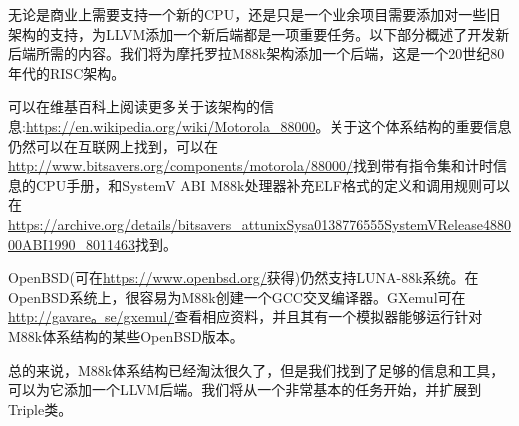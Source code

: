 无论是商业上需要支持一个新的CPU，还是只是一个业余项目需要添加对一些旧架构的支持，为LLVM添加一个新后端都是一项重要任务。以下部分概述了开发新后端所需的内容。我们将为摩托罗拉M88k架构添加一个后端，这是一个20世纪80年代的RISC架构。\par

\begin{tcolorbox}[colback=blue!5!white,colframe=blue!75!black, title=References]
\hspace*{0.7cm}可以在维基百科上阅读更多关于该架构的信息:\url{https://en.wikipedia.org/wiki/Motorola_88000}。关于这个体系结构的重要信息仍然可以在互联网上找到，可以在\url{http://www.bitsavers.org/components/motorola/88000/}找到带有指令集和计时信息的CPU手册，和SystemV ABI M88k处理器补充ELF格式的定义和调用规则可以在\url{https://archive.org/details/bitsavers_attunixSysa0138776555SystemVRelease488000ABI1990_8011463}找到。\par

\hspace*{0.7cm}OpenBSD(可在\url{https://www.openbsd.org/}获得)仍然支持LUNA-88k系统。在OpenBSD系统上，很容易为M88k创建一个GCC交叉编译器。GXemul可在\url{http://gavare。se/gxemul/}查看相应资料，并且其有一个模拟器能够运行针对M88k体系结构的某些OpenBSD版本。
\end{tcolorbox}

总的来说，M88k体系结构已经淘汰很久了，但是我们找到了足够的信息和工具，可以为它添加一个LLVM后端。我们将从一个非常基本的任务开始，并扩展到Triple类。\par





















































